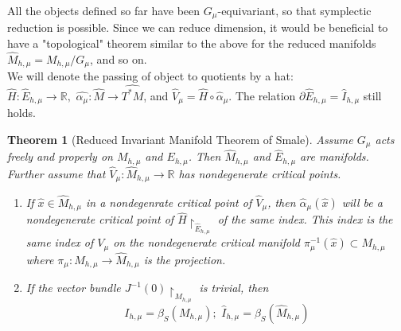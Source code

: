 \documentclass{article}
\newtheorem{thm}{Theorem}
\begin{document}
\indent All the objects defined so far have been $G_{\mu}$-equivariant, so that symplectic reduction is possible. Since we can reduce dimension, it would be beneficial to have a "topological" theorem similar to the above for the reduced manifolds $\widehat{M}_{h,\mu}=M_{h,\mu}/G_{\mu}$, and so on. \\
\indent We will denote the passing of object to quotients by a hat: $\widehat{H}: \widehat{E}_{h,\mu} \to \mathbb{R}, \hspace{4pt} \widehat{\alpha_{\mu}}:\widehat{M} \to \widehat{T^*M}$, and $\widehat{V}_{\mu}= \widehat{H}\circ \widehat{\alpha}_{\mu}$. The relation $\partial \widehat{E}_{h,\mu}=\widehat{I}_{h,\mu}$ still holds.

\begin{thm}[Reduced Invariant Manifold Theorem of Smale]
Assume $G_{\mu}$ acts freely and properly on $M_{h,\mu}$ and $E_{h,\mu}$. Then $\widehat{M}_{h,\mu}$ and $\widehat{E}_{h,\mu}$ are manifolds. Further assume that $\widehat{V}_{\mu}:\widehat{M}_{h,\mu}\to \mathbb{R}$ has nondegenerate critical points.
\begin{enumerate}
    \item If $\widehat{x} \in \widehat{M}_{h,\mu}$ in a nondegenrate critical point of $\widehat{V}_{\mu}$, then $\widehat{\alpha}_{\mu}(\widehat{x})$ will be a nondegenerate critical point of $\widehat{H} \restriction_{\widehat{E}_{h,\mu}}$ of the same index. This index is the same index of $V_{\mu}$ on the nondegenerate critical manifold $\pi_{\mu}^{-1}(\widehat{x}) \subset M_{h,\mu}$ where $\pi_{\mu}:M_{h,\mu} \to \widehat{M}_{h,\mu}$ is the projection. 
    \item If the vector bundle $J^{-1}(0) \restriction_{M_{h,\mu}}$ is trivial, then
    \begin{equation}
        I_{h,\mu} = \beta_S(M_{h,\mu}); \hspace{4pt} \widehat{I}_{h,\mu}=\beta_S (\widehat{M}_{h,\mu})
    \end{equation}
\end{enumerate}
\end{thm}
\end{document}
